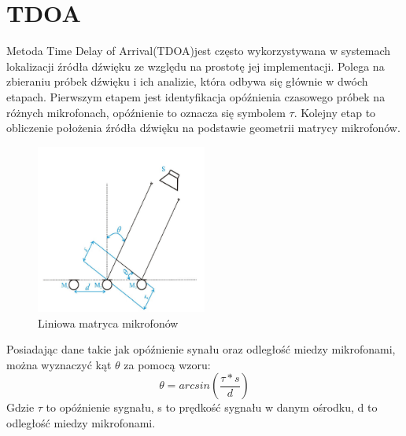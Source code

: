 \documentclass[eng,printmode]{mgr}
\begin{document}
\section{TDOA}
Metoda Time Delay of Arrival(TDOA)jest często wykorzystywana w systemach lokalizacji źródła dźwięku ze względu na prostotę jej implementacji. Polega na zbieraniu próbek dźwięku i ich analizie, która odbywa się głównie w dwóch etapach. Pierwszym etapem jest identyfikacja opóźnienia czasowego próbek na różnych mikrofonach, opóźnienie to oznacza się symbolem $\tau$. Kolejny etap to obliczenie położenia źródła dźwięku na podstawie geometrii matrycy mikrofonów.
\begin{figure}[ht]

    \centering

  \includegraphics[width=0.5\textwidth, angle=0]{matryca.png}

    \caption{Liniowa matryca mikrofonów}

    

\end{figure}
\newpage Posiadając dane takie jak  opóźnienie synału oraz odległość miedzy mikrofonami, można wyznaczyć kąt $\theta$ za pomocą wzoru:
\begin{equation}
\theta = arcsin(\frac{\tau*s}{d}) 
\end{equation}
Gdzie $\tau$ to opóźnienie sygnału, s to prędkość sygnału w danym ośrodku, d to odległość miedzy mikrofonami.
\end{document}
